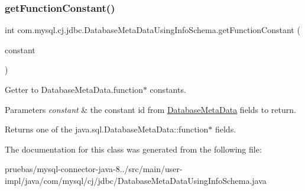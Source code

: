 \subsubsection{\texorpdfstring{get\+Function\+Constant()}{getFunctionConstant()}}
{\footnotesize\ttfamily int com.\+mysql.\+cj.\+jdbc.\+Database\+Meta\+Data\+Using\+Info\+Schema.\+get\+Function\+Constant (\begin{DoxyParamCaption}\item[{\mbox{\hyperlink{enumcom_1_1mysql_1_1cj_1_1jdbc_1_1_database_meta_data_using_info_schema_1_1_function_constant}{Function\+Constant}}}]{constant }\end{DoxyParamCaption})\hspace{0.3cm}{\ttfamily [protected]}}

Getter to Database\+Meta\+Data.\+function$\ast$ constants.


\begin{DoxyParams}{Parameters}
{\em constant} & the constant id from \mbox{\hyperlink{classcom_1_1mysql_1_1cj_1_1jdbc_1_1_database_meta_data}{Database\+Meta\+Data}} fields to return.\\
\hline
\end{DoxyParams}
\begin{DoxyReturn}{Returns}
one of the java.\+sql.\+Database\+Meta\+Data\+::function$\ast$ fields. 
\end{DoxyReturn}


The documentation for this class was generated from the following file\+:\begin{DoxyCompactItemize}
\item 
pruebas/mysql-\/connector-\/java-\/8../src/main/user-\/impl/java/com/mysql/cj/jdbc/Database\+Meta\+Data\+Using\+Info\+Schema.\+java\end{DoxyCompactItemize}
